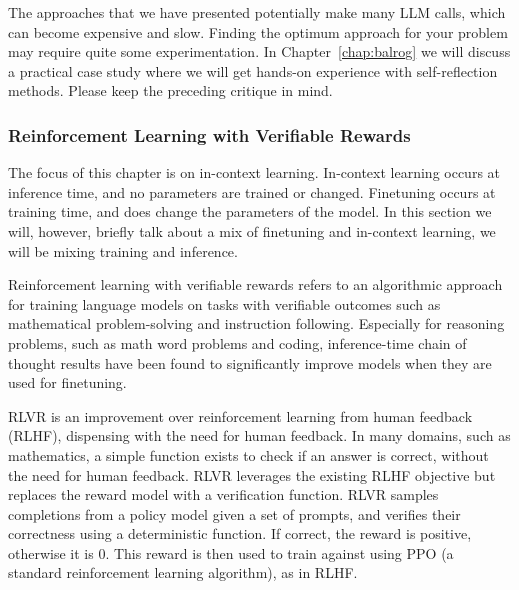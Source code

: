 The approaches that we have presented potentially make many LLM calls, which can become expensive and slow. Finding the optimum approach for your problem may require quite some experimentation. In Chapter~\ref{chap:balrog} we will discuss a practical case study where we will get hands-on experience with self-reflection methods. Please keep the preceding critique in mind.


\subsubsection{Reinforcement Learning with Verifiable Rewards}\label{sec:rlvr}
The focus of this chapter is on in-context learning. In-context learning occurs at inference time, and no parameters are trained or changed. Finetuning occurs at training time, and does change the parameters of the model. In this section we will, however, briefly talk about a mix of finetuning and in-context learning,  we will be mixing training and inference.



Reinforcement learning with verifiable rewards refers to an algorithmic approach for training
language models on tasks with verifiable outcomes such as mathematical problem-solving and instruction
following. Especially for reasoning problems, such as math word problems and coding, inference-time chain of thought results have been found to significantly improve models when they are used for finetuning.

RLVR is an improvement over reinforcement learning from human feedback (RLHF), dispensing with the need for human feedback. In many domains, such as mathematics, a simple function exists to check if an answer is correct, without the need for human feedback. RLVR leverages the existing RLHF objective but replaces the reward model with a verification
function. RLVR samples completions
from a policy model given a set of prompts, and verifies their correctness using a deterministic function. If correct, the reward is positive, otherwise it is 0. This reward is then used to train against using PPO \citep{schulman2017proximal} (a standard reinforcement learning algorithm), as in RLHF.


